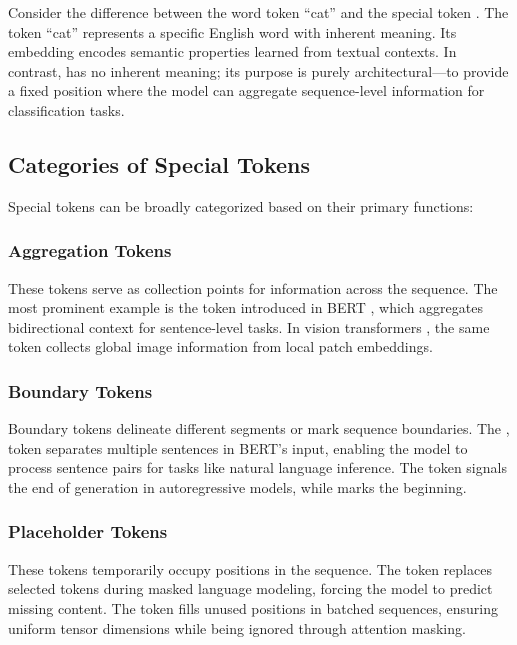 Consider the difference between the word token ``cat'' and the special token \cls{}. The token ``cat'' represents a specific English word with inherent meaning. Its embedding encodes semantic properties learned from textual contexts. In contrast, \cls{} has no inherent meaning; its purpose is purely architectural---to provide a fixed position where the model can aggregate sequence-level information for classification tasks.

\subsection{Categories of Special Tokens}

Special tokens can be broadly categorized based on their primary functions:

\subsubsection{Aggregation Tokens}
These tokens serve as collection points for information across the sequence. The most prominent example is the \cls{} token introduced in BERT \citep{devlin2018bert}, which aggregates bidirectional context for sentence-level tasks. In vision transformers \citep{dosovitskiy2020image}, the same \cls{} token collects global image information from local patch embeddings.

\subsubsection{Boundary Tokens}
Boundary tokens delineate different segments or mark sequence boundaries. The \sep{} token separates multiple sentences in BERT's input, enabling the model to process sentence pairs for tasks like natural language inference. The \eos{} token signals the end of generation in autoregressive models, while \sos{} marks the beginning.

\subsubsection{Placeholder Tokens}
These tokens temporarily occupy positions in the sequence. The \mask{} token replaces selected tokens during masked language modeling, forcing the model to predict missing content. The \pad{} token fills unused positions in batched sequences, ensuring uniform tensor dimensions while being ignored through attention masking.

